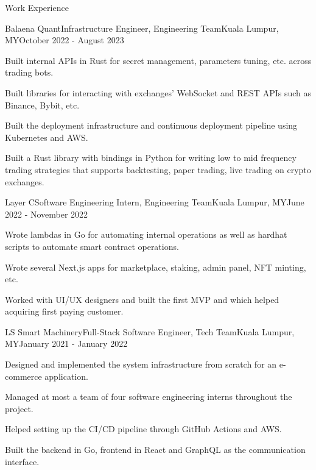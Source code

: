 \documentclass{article}
\newlength{\tabin}
\newlength{\secsep}
\newcommand{\lineunder}{\vspace*{-8pt} \\ \hspace*{-6pt} \hrulefill \\ \vspace*{-15pt}}
\newenvironment{tabbedsection}[1]{
  \begin{list}{}{
      \setlength{\itemsep}{0pt}
      \setlength{\labelsep}{0pt}
      \setlength{\labelwidth}{0pt}
      \setlength{\leftmargin}{\tabin}
      \setlength{\rightmargin}{\tabin}
      \setlength{\listparindent}{0pt}
      \setlength{\parsep}{0pt}
      \setlength{\parskip}{0pt}
      \setlength{\partopsep}{0pt}
      \setlength{\topsep}{#1}
    }
  \item[]
}{\end{list}}
\newenvironment{resume_section}[1]{
  \filbreak
  \vspace{2\secsep}
  \textsc{\large#1}
  \lineunder
  \begin{tabbedsection}{\secsep}
}{\end{tabbedsection}}
\newenvironment{subitems}{
  \renewcommand{\labelitemi}{-}
  \begin{itemize}
      \setlength{\labelsep}{1em}
}{\end{itemize}}
\newenvironment{resume_employer}[4]{
  \vspace{\secsep}
  \textbf{#1} \\ 
  \indent {\small #2} \hfill {\footnotesize#3 (#4)}
  \begin{tabbedsection}{0pt}
  \begin{subitems}
}{\end{subitems}\end{tabbedsection}}
\begin{document}
\begin{resume_section}{Work Experience}
  \begin{resume_employer}{Balaena Quant}{Infrastructure Engineer, Engineering Team}{Kuala Lumpur, MY}{October 2022 - August 2023}
    \item Built internal APIs in Rust for secret management, parameters tuning, etc. across trading bots.
    \item Built libraries for interacting with exchanges' WebSocket and REST APIs such as Binance, Bybit, etc.
    \item Built the deployment infrastructure and continuous deployment pipeline using Kubernetes and AWS.
    \item Built a Rust library with bindings in Python for writing low to mid frequency trading strategies that supports backtesting, paper trading, live trading on crypto exchanges.
  \end{resume_employer}

  \begin{resume_employer}{Layer C}{Software Engineering Intern, Engineering Team}{Kuala Lumpur, MY}{June 2022 - November 2022}
    \item Wrote lambdas in Go for automating internal operations as well as hardhat scripts to automate smart contract operations.
    \item Wrote several Next.js apps for marketplace, staking, admin panel, NFT minting, etc.
    \item Worked with UI/UX designers and built the first MVP and which helped acquiring first paying customer.
  \end{resume_employer}

  \begin{resume_employer}{LS Smart Machinery}{Full-Stack Software Engineer, Tech Team}{Kuala Lumpur, MY}{January 2021 - January 2022}
    \item Designed and implemented the system infrastructure from scratch for an e-commerce application.
    \item Managed at most a team of four software engineering interns throughout the project.
    \item Helped setting up the CI/CD pipeline through GitHub Actions and AWS.
    \item Built the backend in Go, frontend in React and GraphQL as the communication interface.
  \end{resume_employer}
\end{resume_section}
\end{document}
